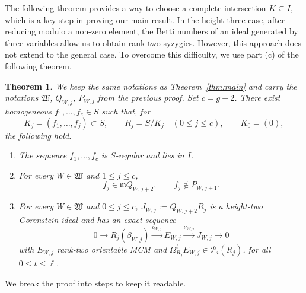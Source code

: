 \documentclass[11pt,letterpaper]{amsart}
\newcommand{\m}{\mathfrak m}
\newcommand{\x}{\xrightarrow{}}
\newcommand{\sW}{\mathfrak W}
\theoremstyle{plain}
\newtheorem{thm}{Theorem}[section]
\theoremstyle{definition}
\theoremstyle{remark}
\begin{document}
The following theorem provides a way to choose a complete intersection \(K\subseteq I\), which is a key step in proving our main result. In the height-three case, after reducing modulo a non-zero element, the Betti numbers of an ideal generated by three variables allow us to obtain rank-two syzygies. However, this approach does not extend to the general case. To overcome this difficulty, we use part (c) of the following theorem. 
\begin{thm}\label{thm:construction}
We keep the same notations as Theorem~\ref{thm:main} and carry the notations $\mathfrak W$, $Q_{W,j}$, $P_{W,j}$ from the previous proof. Set \(c=g-2\).
There exist homogeneous \(f_1,\ldots,f_c\in S\) such that, for
\[
 K_j=(f_1,\ldots,f_j)\subset S,\qquad R_j=S/K_j
 \quad(0\leq j\leq c),\qquad K_0=(0),
\]
the following hold.
\begin{enumerate}
\item[$(a)$] The sequence \(f_1,\ldots,f_c\) is \(S\)-regular and lies in \(I\).
\item[$(b)$] For every \(W\in\sW\) and \(1\leq j\leq c\),
\[
 f_j\in\m Q_{W,j+2},\qquad f_j\notin P_{W,j+1}.
\]
\item[$(c)$] For every \(W\in\sW\) and \(0\leq j\leq c\),
\(J_{W,j}:=Q_{W,j+2}R_j\) is a height-two Gorenstein ideal and has
an exact sequence
\[
 0\x R_j(\beta_{W,j})\xrightarrow{\iota_{W,j}}E_{W,j}
 \xrightarrow{\nu_{W,j}}J_{W,j}\x0
\]
with \(E_{W,j}\) rank-two orientable MCM and $ \Omega_{R_j}^tE_{W,j}\in\mathcal{P}_{i}(R_j)$, for all $0\leq t\leq\ell$.
\end{enumerate}
\end{thm}
We break the proof into steps to keep it readable. 
\end{document}

